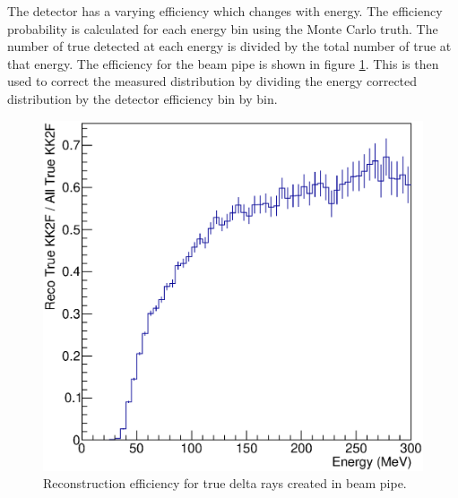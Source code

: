 	The \babar detector has a varying efficiency which changes with energy. The efficiency probability is calculated for each energy bin using the Monte Carlo truth. The number of true detected \deltarays at each energy is divided by the total number of true \deltarays at that energy. The efficiency for the beam pipe is shown in figure \ref{BPeff}. This is then used to correct the measured distribution by dividing the energy corrected \deltaray distribution by the detector efficiency bin by bin.
	\begin{figure}[!htb]
		\label{BPeff}
		\centering
		\includegraphics[scale=0.5]{figures/Efficiency.eps}
		\caption{Reconstruction efficiency for true delta rays created in beam pipe.}
	\end{figure}

